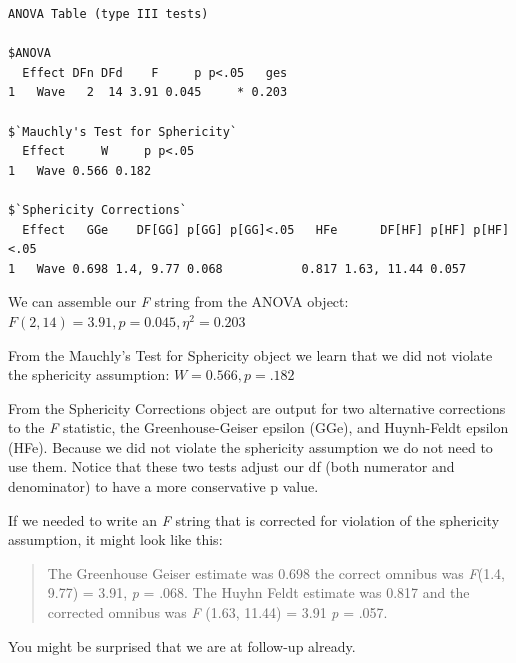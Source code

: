 \documentclass[
  11pt,
]{book}
\begin{document}
\begin{verbatim}
ANOVA Table (type III tests)

$ANOVA
  Effect DFn DFd    F     p p<.05   ges
1   Wave   2  14 3.91 0.045     * 0.203

$`Mauchly's Test for Sphericity`
  Effect     W     p p<.05
1   Wave 0.566 0.182      

$`Sphericity Corrections`
  Effect   GGe    DF[GG] p[GG] p[GG]<.05   HFe      DF[HF] p[HF] p[HF]<.05
1   Wave 0.698 1.4, 9.77 0.068           0.817 1.63, 11.44 0.057          
\end{verbatim}

We can assemble our \emph{F} string from the ANOVA object: \(F(2,14) = 3.91, p = 0.045, \eta^2 = 0.203\)

From the Mauchly's Test for Sphericity object we learn that we did not violate the sphericity assumption: \(W = 0.566, p = .182\)

From the Sphericity Corrections object are output for two alternative corrections to the \emph{F} statistic, the Greenhouse-Geiser epsilon (GGe), and Huynh-Feldt epsilon (HFe). Because we did not violate the sphericity assumption we do not need to use them. Notice that these two tests adjust our df (both numerator and denominator) to have a more conservative p value.

If we needed to write an \emph{F} string that is corrected for violation of the sphericity assumption, it might look like this:

\begin{quote}
The Greenhouse Geiser estimate was 0.698 the correct omnibus was \emph{F}(1.4, 9.77) = 3.91, \emph{p} = .068.
The Huyhn Feldt estimate was 0.817 and the corrected omnibus was \emph{F} (1.63, 11.44) = 3.91 \emph{p} = .057.
\end{quote}

You might be surprised that we are at follow-up already.
\end{document}

